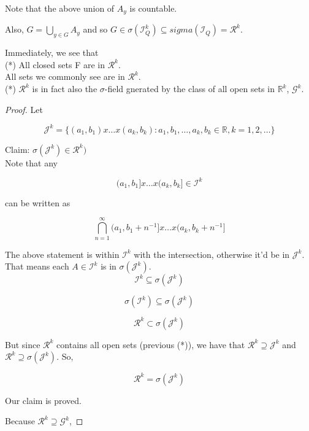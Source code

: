 \documentclass[11pt,fleqn]{book} %
\begin{document}
Note that the above union of $A_y$ is countable. 

Also,  $G = \bigcup_{y \in G} A_y$ and so $G \in \sigma(\mathcal{I}^k_Q) \subseteq sigma(\mathcal{I}_Q) = \mathcal{R}^k$.

Immediately, we see that\\

(*) All closed sets F are in $\mathcal{R}^k$.\\

All sets we commonly see are in $\mathcal{R}^k$.\\

(*) $\mathcal{R}^k$ is in fact also the $\sigma$-field gnerated by the class of all open sets in $\mathbb{R}^k$, $\mathcal{G}^k$.

\begin{proof}
	Let

	$$\mathcal{J}^k = \{(a_1, b_1)x \dots x (a_k, b_k): a_1, b_1, \dots, a_k, b_k \in \mathbb{R}, k = 1, 2, \dots \} $$

	Claim: $\sigma(\mathcal{J}^k) \in \mathcal{R}^k)$\\


	Note that any

	$$(a_1, b_1]x \dots x (a_k, b_k] \in \mathcal{I}^k$$

	can be written as 

	$$\bigcap ^\infty_{n=1} (a_1, b_1 + n^{-1}] x \dots x (a_k, b_k + n^{-1}]  $$

	
		The above statement is within $\mathcal{I}^k$ with the intersection, otherwise it'd be in $\mathcal{J}^k$.\\

		That means each $A \in \mathcal{I}^k$ is in $\sigma(\mathcal{J}^k)$.\\

		$$\mathcal{I}^k \subseteq \sigma(\mathcal{J}^k) $$

		$$ \sigma(\mathcal{I}^k) \subseteq \sigma(\mathcal{J}^k)$$

		$$\mathcal{R}^k \subset\sigma(\mathcal{J}^k) $$

		But since $\mathcal{R}^k$ contains all open sets (previous (*)), we have that $\mathcal{R}^k \supseteq \mathcal{J}^k$ and $ \mathcal{R}^k \supseteq \sigma(\mathcal{J}^k)$. So, 

		$$\mathcal{R}^k = \sigma(\mathcal{J}^k) $$

		Our claim is proved. 

	Because $\mathcal{R}^k \supseteq \mathcal{G}^k$, 


\end{proof}
\end{document}
